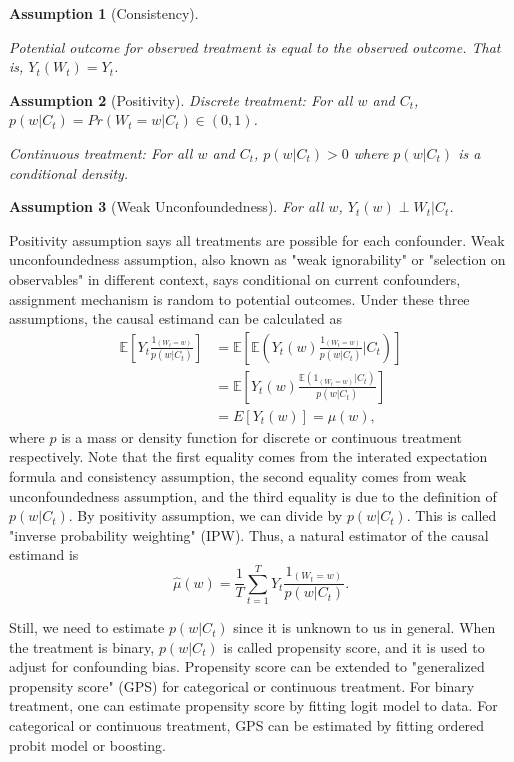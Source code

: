 \documentclass[12pt]{article}
\newtheorem{asm}{Assumption}
\begin{document}
\begin{asm}[Consistency]\label{asm:consistency}\hfill

	Potential outcome for observed treatment is equal to the observed outcome.
	That is, $Y_t(W_t) = Y_t$.
\end{asm}

\begin{asm}[Positivity]\hfill

	Discrete treatment:
	For all $w$ and $C_t$, $p(w\lvert C_t) = Pr\left ( W_t = w \lvert C_t\right ) \in (0, 1)$.

	Continuous treatment:
	For all $w$ and $C_t$, $p(w\lvert C_t) > 0$ where $p(w\lvert C_t)$ is a conditional density.
\end{asm}


\begin{asm}[Weak Unconfoundedness] \hfill

	For all $w$, $Y_{t}(w) \perp W_t \lvert C_t$.
\end{asm}


Positivity assumption says all treatments are possible for each confounder.
Weak unconfoundedness assumption, 
also known as "weak ignorability" or "selection on observables" in different context, says
conditional on current confounders, assignment mechanism is random to potential outcomes.
Under these three assumptions, the causal estimand can be calculated as
\[
	\begin{split}
		\mathbb{E}\left[ Y_t\frac{1_{(W_t = w)}}{p(w\lvert C_t)} \right]
		& = \mathbb{E}\left[ \mathbb{E}\left( Y_t(w) \frac{1_{(W_t = w)}}{p(w\lvert C_t)} \lvert C_t\right)\right]\\
		& = \mathbb{E}\left[ Y_t(w)\frac{\mathbb{E}\left( 1_{(W_t = w)}\lvert C_t \right)}{p(w\lvert C_t)} \right]\\
		& = E\left[ Y_t(w) \right] = \mu(w),
	\end{split}
\]
where $p$ is a mass or density function for discrete or continuous treatment respectively.
Note that the first equality comes from the interated expectation formula and consistency assumption,
the second equality comes from weak unconfoundedness assumption,
and the third equality is due to the definition of $p(w\lvert C_t)$.
By positivity assumption, we can divide by $p(w\lvert C_t)$.
This is called "inverse probability weighting" (IPW).
Thus, a natural estimator of the causal estimand is
\[
	\hat{\mu}(w) = \frac{1}{T}\sum_{t = 1}^T Y_t \frac{1_{(W_t = w)}}{p(w\lvert C_t)}.	
\]

Still, we need to estimate $p(w\lvert C_t)$ since it is unknown to us in general.
When the treatment is binary, $p(w\lvert C_t)$ is called propensity score,
and it is used to adjust for confounding bias\cite{rosenbaum1983}.
Propensity score can be extended to 
"generalized propensity score" (GPS) for categorical or continuous treatment\cite{imbens2000}.
For binary treatment, one can estimate propensity score by fitting logit model to data.
For categorical or continuous treatment, GPS can be estimated by fitting ordered probit model or boosting.
\end{document}
